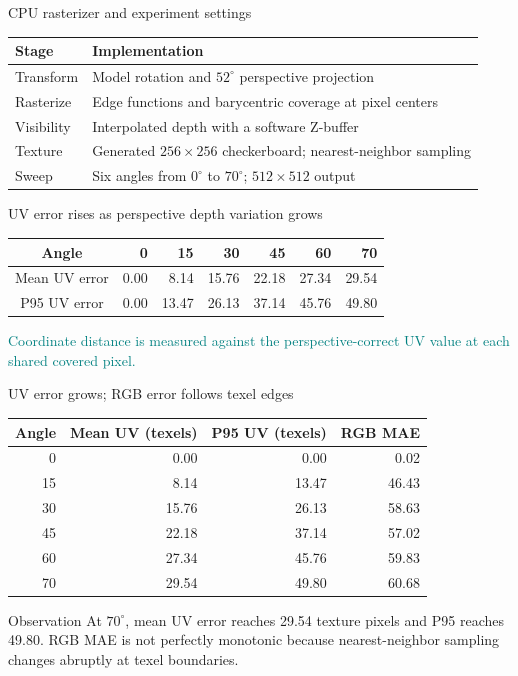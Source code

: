 \documentclass[aspectratio=169]{beamer}
\begin{document}
\begin{frame}{CPU rasterizer and experiment settings}
\begin{tabular}{ll}
\textbf{Stage} & \textbf{Implementation}\\\hline
Transform & Model rotation and $52^\circ$ perspective projection\\
Rasterize & Edge functions and barycentric coverage at pixel centers\\
Visibility & Interpolated depth with a software Z-buffer\\
Texture & Generated $256\times256$ checkerboard; nearest-neighbor sampling\\
Sweep & Six angles from $0^\circ$ to $70^\circ$; $512\times512$ output
\end{tabular}
\end{frame}

\begin{frame}{UV error rises as perspective depth variation grows}
\centering
\begin{tabular}{c|rrrrrr}
Angle & 0 & 15 & 30 & 45 & 60 & 70\\\hline
Mean UV error & 0.00 & 8.14 & 15.76 & 22.18 & 27.34 & 29.54\\
P95 UV error & 0.00 & 13.47 & 26.13 & 37.14 & 45.76 & 49.80
\end{tabular}
\vspace{12pt}

\textcolor{teal}{Coordinate distance is measured against the perspective-correct UV value at each shared covered pixel.}
\end{frame}

\begin{frame}{UV error grows; RGB error follows texel edges}
\begin{table}\centering\small
\begin{tabular}{r|rrr}
Angle & Mean UV (texels) & P95 UV (texels) & RGB MAE\\\hline
0 & 0.00 & 0.00 & 0.02\\
15 & 8.14 & 13.47 & 46.43\\
30 & 15.76 & 26.13 & 58.63\\
45 & 22.18 & 37.14 & 57.02\\
60 & 27.34 & 45.76 & 59.83\\
70 & 29.54 & 49.80 & 60.68
\end{tabular}\end{table}
\begin{block}{Observation}
At $70^\circ$, mean UV error reaches 29.54 texture pixels and P95 reaches 49.80. RGB MAE is not perfectly monotonic because nearest-neighbor sampling changes abruptly at texel boundaries.
\end{block}
\end{frame}
\end{document}
